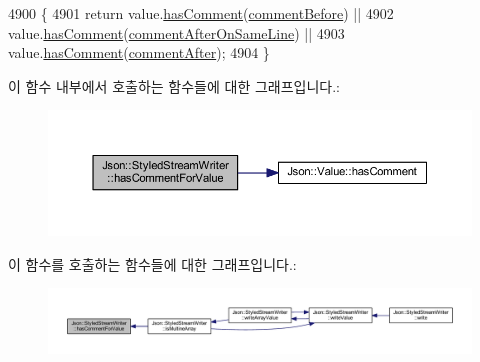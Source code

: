 \begin{DoxyCode}
4900                                                               \{
4901   \textcolor{keywordflow}{return} value.\hyperlink{class_json_1_1_value_a65d8e3ab6a5871cbd019a3e0f0b944a3}{hasComment}(\hyperlink{namespace_json_a4fc417c23905b2ae9e2c47d197a45351a52f1733775460517b2ea6bedf4906d52}{commentBefore}) ||
4902          value.\hyperlink{class_json_1_1_value_a65d8e3ab6a5871cbd019a3e0f0b944a3}{hasComment}(\hyperlink{namespace_json_a4fc417c23905b2ae9e2c47d197a45351a008a230a0586de54f30b76afe70fdcfa}{commentAfterOnSameLine}) ||
4903          value.\hyperlink{class_json_1_1_value_a65d8e3ab6a5871cbd019a3e0f0b944a3}{hasComment}(\hyperlink{namespace_json_a4fc417c23905b2ae9e2c47d197a45351ac5784ca53b12250888ddb642b06aebef}{commentAfter});
4904 \}
\end{DoxyCode}
이 함수 내부에서 호출하는 함수들에 대한 그래프입니다.\+:\nopagebreak
\begin{figure}[H]
\begin{center}
\leavevmode
\includegraphics[width=350pt]{class_json_1_1_styled_stream_writer_ad2892f57171919fa4f8a5ae5574755cf_cgraph}
\end{center}
\end{figure}
이 함수를 호출하는 함수들에 대한 그래프입니다.\+:\nopagebreak
\begin{figure}[H]
\begin{center}
\leavevmode
\includegraphics[width=350pt]{class_json_1_1_styled_stream_writer_ad2892f57171919fa4f8a5ae5574755cf_icgraph}
\end{center}
\end{figure}
\mbox{\label{class_json_1_1_styled_stream_writer_ab49409578422aa73b060e3492dd6c72a}} 
